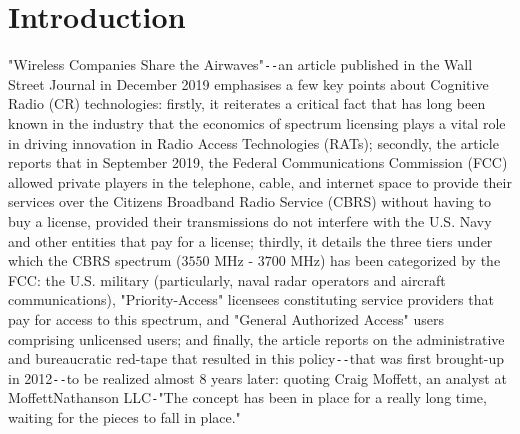 \documentclass[12pt, draftcls, onecolumn]{IEEEtran}
\begin{document}
\section{Introduction}\label{O}
"Wireless Companies Share the Airwaves"\texttt{-{}-}an article \cite{WSJ:CBRS} published in the Wall Street Journal in December 2019 emphasises a few key points about Cognitive Radio (CR) technologies: firstly, it reiterates a critical fact that has long been known in the industry that the economics of spectrum licensing plays a vital role in driving innovation in Radio Access Technologies (RATs); secondly, the article reports that in September 2019, the Federal Communications Commission (FCC) allowed private players in the telephone, cable, and internet space to provide their services over the Citizens Broadband Radio Service (CBRS) without having to buy a license, provided their transmissions do not interfere with the U.S. Navy and other entities that pay for a license; thirdly, it details the three tiers under which the CBRS spectrum ($3550$ MHz - $3700$ MHz) has been categorized by the FCC: the U.S. military (particularly, naval radar operators and aircraft communications), "Priority-Access" licensees constituting service providers that pay for access to this spectrum, and "General Authorized Access" users comprising unlicensed users; and finally, the article reports on the administrative and bureaucratic red-tape that resulted in this policy\texttt{-{}-}that was first brought-up in 2012\texttt{-{}-}to be realized almost 8 years later: quoting Craig Moffett, an analyst at MoffettNathanson LLC\texttt{-}"The concept has been in place for a really long time, waiting for the pieces to fall in place."
\end{document}
